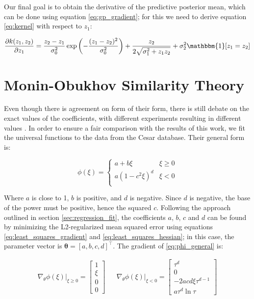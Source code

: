 \documentclass[12pt]{book}
\begin{document}
Our final goal is to obtain the derivative of the predictive posterior mean, which can be done using equation \ref{eq:gp_gradient}; for this we need to derive equation \ref{eq:kernel} with respect to $z_1$:

\begin{equation}
\label{eq:kernel_derivative}
\frac{\partial k(z_1,z_2)}{\partial z_1}=\frac{z_2-z_1}{\sigma_0^2}\exp\left(-\frac{(z_1-z_2)^2}{\sigma_0^2}\right)+\frac{z_2}{2\sqrt{\sigma_1^2+z_1z_2}}+\sigma_2^2\mathbbm{1}[z_1=z_2]
\end{equation}



\section{Monin-Obukhov Similarity Theory}
\label{sec:most_fit}

Even though there is agreement on form of their form, there is still debate on the exact values of the coefficients, with different experiments resulting in different values \citep{hogstrom88}. In order to ensure a fair comparison with the results of this work, we fit the universal functions to the data from the Cesar database. Their general form is:

\begin{equation}
\label{eq:phi_general}
\phi(\xi)=\begin{cases}
a+b\xi & \xi\geq 0 \\
a(1-c^2\xi)^d & \xi<0 \\
\end{cases}
\end{equation}

Where $a$ is close to 1, $b$ is positive, and $d$ is negative. Since $d$ is negative, the base of the power must be positive, hence the squared $c$. Following the approach outlined in section \ref{sec:regression_fit}, the coefficients $a$, $b$, $c$ and $d$ can be found by minimizing the L2-regularized mean squared error using equations \ref{eq:least_squares_gradient} and \ref{eq:least_squares_hessian}; in this case, the parameter vector is $\bm\theta=\left[a,b,c,d\right]^\intercal$. The gradient of \ref{eq:phi_general} is:


\begin{align}
\nabla_\theta\phi(\xi)\vert_{\xi\geq 0}=\begin{bmatrix}
1 \\ \xi \\ 0 \\ 0
\end{bmatrix} &&
\nabla_\theta\phi(\xi)\vert_{\xi<0}=\begin{bmatrix}
\tau^d \\ 0 \\ -2acd\xi\tau^{d-1} \\ a\tau^d\ln\tau
\end{bmatrix}
\end{align}
\end{document}
